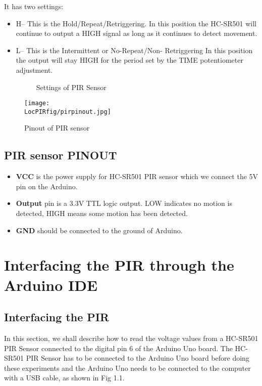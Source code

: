 It has two settings:
\begin{itemize}
  \item 	H– This is the Hold/Repeat/Retriggering. In this position the HC-SR501 will continue to output a HIGH signal as long as it continues to detect   movement.
  \item  L– This is the Intermittent or No-Repeat/Non- Retriggering In this position the output will stay HIGH for the period set by the TIME potentiometer adjustment.
\begin{figure}[hpt]
  \centering
   \hfill
  \caption{Settings of PIR Sensor}
\end{figure}
\end{itemize}
\begin{figure}[hpt]
  \centering
    \texttt{[image: \\LocPIRfig/pirpinout.jpg]}
    \label{fig:pinp} \hfill
  \caption{Pinout of PIR sensor}
\end{figure} 
\subsection{PIR sensor PINOUT}


\begin{itemize}
  \item \textbf{VCC} is the power supply for HC-SR501 PIR sensor which we connect the 5V pin on the Arduino.
  \item \textbf{Output} pin is a 3.3V TTL logic output. LOW indicates no motion is detected, HIGH means some motion has been detected.
  \item \textbf{GND} should be connected to the ground of Arduino.
\end{itemize}

\section{Interfacing the PIR through the Arduino IDE}
\label{sec:pir-arduino-code}
\label{sec:pir-arduino-code}
\subsection{Interfacing the PIR}
In this section, we shall describe how to read the voltage values from a HC-SR501 PIR Sensor connected to the digital pin 6 of the Arduino Uno board. The HC-SR501 PIR Sensor has to be connected to the Arduino Uno board before doing these experiments and the Arduino Uno needs to be connected to the computer with a USB cable, as shown in Fig 1.1.


